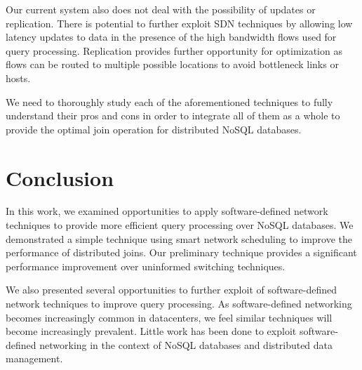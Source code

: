 \documentclass{sig-alternate-2013}
\begin{document}
Our current system also does not deal with the possibility of updates or
replication.  There is potential to further exploit SDN techniques by allowing
low latency updates to data in the presence of the high bandwidth flows used
for query processing.  Replication provides further opportunity for
optimization as flows can be routed to multiple possible locations to avoid
bottleneck links or hosts.

We need to thoroughly study each of the aforementioned techniques to fully
understand their pros and cons in order to integrate all of them as a whole to
provide the optimal join operation for distributed NoSQL databases.

\section{Conclusion}

In this work, we examined opportunities to apply software-defined network
techniques to provide more efficient query processing over NoSQL databases.  We
demonstrated a simple technique using smart network scheduling to improve the
performance of distributed joins.  Our preliminary technique provides a
significant performance improvement over uninformed switching techniques.

We also presented several opportunities to further exploit of software-defined
network techniques to improve query processing.  As software-defined networking
becomes increasingly common in datacenters, we feel similar techniques will
become increasingly prevalent.  Little work has been done to exploit
software-defined networking in the context of NoSQL databases and distributed
data management.

\let\theOLDbibliography\thebibliography\renewcommand{\thebibliography}[1]{\theOLDbibliography{#1}%
\item[]\vspace*{0.5mm}}


{\scriptsize

}
\end{document}
